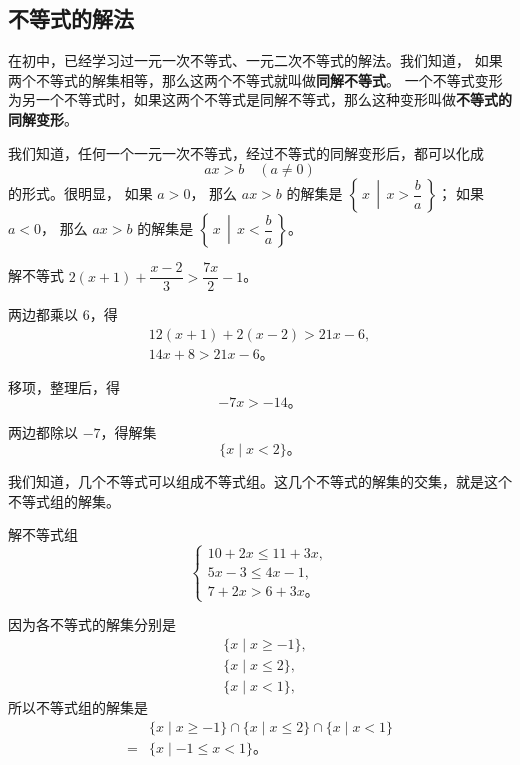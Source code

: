 \subsection{不等式的解法}\label{subsec:3-4}

在初中，已经学习过一元一次不等式、一元二次不等式的解法。我们知道，
如果两个不等式的解集相等，那么这两个不等式就叫做\textbf{同解不等式}。
一个不等式变形为另一个不等式时，如果这两个不等式是同解不等式，那么这种变形叫做\textbf{不等式的同解变形}。

我们知道，任何一个一元一次不等式，经过不等式的同解变形后，都可以化成
$$ ax > b \quad (a \neq 0) $$
的形式。很明显，
如果 $a > 0$， 那么 $ax > b$ 的解集是 $\left\{\, x \,\middle|\, x > \dfrac{b}{a} \,\right\}$；
如果 $a < 0$， 那么 $ax > b$ 的解集是 $\left\{\, x \,\middle|\, x < \dfrac{b}{a} \,\right\}$。

\liti 解不等式 $2(x + 1) + \dfrac{x - 2}{3} > \dfrac{7x}{2} - 1$。

\jie 两边都乘以 $6$，得
\begin{gather*}
    12(x + 1) + 2(x - 2) > 21x - 6 , \\
    14x + 8 > 21x - 6 \text{。}
\end{gather*}

移项，整理后，得
$$ -7x > -14 \text{。} $$

两边都除以 $-7$，得解集
$$ \{ x \mid x < 2 \} \text{。} $$

我们知道，几个不等式可以组成不等式组。这几个不等式的解集的交集，就是这个不等式组的解集。

\liti 解不等式组
$$\begin{cases}
    10 + 2x \leqslant 11 + 3x, \\
    5x - 3 \leqslant 4x - 1, \\
    7 + 2x > 6 + 3x \text{。}
\end{cases}$$

\jie 因为各不等式的解集分别是
\begin{align*}
    & \{ x \mid x \geqslant -1 \}, \\
    & \{ x \mid x \leqslant 2 \}, \\
    & \{ x \mid x < 1 \},
\end{align*}
所以不等式组的解集是
\begin{align*}
        & \{ x \mid x \geqslant -1 \} \cap \{ x \mid x \leqslant 2 \} \cap \{ x \mid x < 1 \} \\
    ={} & \{ x \mid -1 \leqslant x < 1 \} \text{。}
\end{align*}

